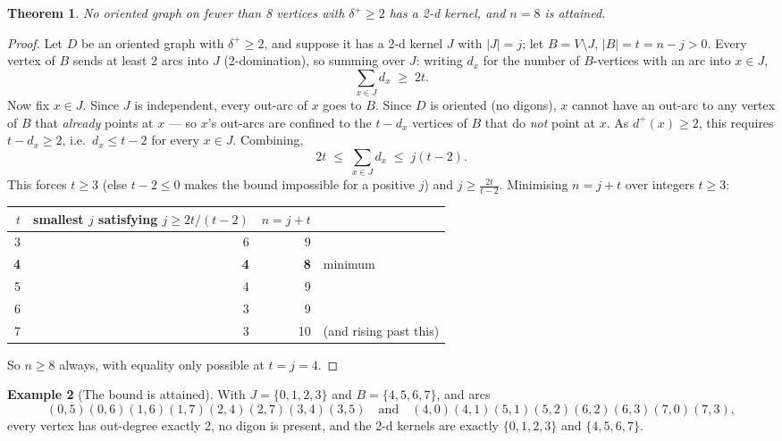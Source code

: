 \documentclass[11pt]{article}
\theoremstyle{plain}
\newtheorem{theorem}{Theorem}[section]
\theoremstyle{definition}
\newtheorem{example}[theorem]{Example}
\theoremstyle{remark}
\begin{document}
\begin{theorem}
No oriented graph on fewer than 8 vertices with $\delta^+ \ge 2$ has a 2-d kernel, and
$n = 8$ is attained.
\end{theorem}

\begin{proof}
Let $D$ be an oriented graph with $\delta^+ \ge 2$, and suppose it has a 2-d kernel $J$
with $|J| = j$; let $B = V \setminus J$, $|B| = t = n - j > 0$. Every vertex of $B$
sends at least 2 arcs into $J$ (2-domination), so summing over $J$: writing $d_x$ for
the number of $B$-vertices with an arc into $x \in J$,
\[
\sum_{x \in J} d_x \;\ge\; 2t.
\]
Now fix $x \in J$. Since $J$ is independent, every out-arc of $x$ goes to $B$. Since
$D$ is oriented (no digons), $x$ cannot have an out-arc to any vertex of $B$ that
\emph{already} points at $x$ — so $x$'s out-arcs are confined to the $t - d_x$
vertices of $B$ that do \emph{not} point at $x$. As $d^+(x) \ge 2$, this requires
$t - d_x \ge 2$, i.e.\ $d_x \le t - 2$ for every $x \in J$. Combining,
\[
2t \;\le\; \sum_{x\in J} d_x \;\le\; j (t-2).
\]
This forces $t \ge 3$ (else $t - 2 \le 0$ makes the bound impossible for a positive
$j$) and $j \ge \frac{2t}{t-2}$. Minimising $n = j + t$ over integers $t \ge 3$:

\begin{center}
\begin{tabular}{@{}rrrl@{}}
\toprule
$t$ & smallest $j$ satisfying $j \ge 2t/(t{-}2)$ & $n = j+t$ & \\
\midrule
3 & 6 & 9 & \\
\textbf{4} & \textbf{4} & \textbf{8} & minimum \\
5 & 4 & 9 & \\
6 & 3 & 9 & \\
7 & 3 & 10 & (and rising past this) \\
\bottomrule
\end{tabular}
\end{center}
So $n \ge 8$ always, with equality only possible at $t = j = 4$.
\end{proof}

\begin{example}[The bound is attained]
With $J = \{0,1,2,3\}$ and $B = \{4,5,6,7\}$, and arcs
\[
(0,5)(0,6)(1,6)(1,7)(2,4)(2,7)(3,4)(3,5) \quad\text{and}\quad
(4,0)(4,1)(5,1)(5,2)(6,2)(6,3)(7,0)(7,3),
\]
every vertex has out-degree exactly 2, no digon is present, and the 2-d kernels are
exactly $\{0,1,2,3\}$ and $\{4,5,6,7\}$.
\end{example}
\end{document}
